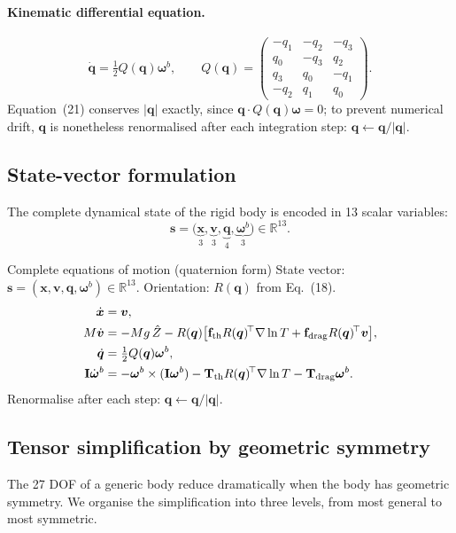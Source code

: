 \documentclass[11pt]{article}
\newcommand{\vect}[1]{\bm{#1}}
\newcommand{\T}{^{\!\top}}
\begin{document}
\paragraph{Kinematic differential equation.}
\begin{equation}
  \dot{\vect q}=\tfrac12 Q(\vect q)\vect\omega^b,\qquad
  Q(\vect q)=\begin{pmatrix}-q_1 & -q_2 & -q_3\\ q_0 & -q_3 & q_2\\ q_3 & q_0 & -q_1\\ -q_2 & q_1 & q_0\end{pmatrix}.
\end{equation}
Equation~(21) conserves $|\vect q|$ exactly, since $\vect q\cdot Q(\vect q)\vect\omega=0$; to prevent numerical drift, $\vect q$ is nonetheless renormalised after each integration step: $\vect q\leftarrow\vect q/|\vect q|$.

\subsection{State-vector formulation}
The complete dynamical state of the rigid body is encoded in 13 scalar variables:
\begin{equation}
  \vect s = \big(\underbrace{\vect x}_{3},\underbrace{\vect v}_{3},\underbrace{\vect q}_{4},\underbrace{\vect\omega^b}_{3}\big)\in\mathbb R^{13}.
\end{equation}
\begin{eqbox}{Complete equations of motion (quaternion form)}
State vector: $\vect s=(\vect x,\vect v,\vect q,\vect\omega^b)\in\mathbb R^{13}$. \quad Orientation: $R(\vect q)$ from Eq.~(18).
\begin{align}
  \dot{\vect x} &= \vect v,\\
  M\dot{\vect v} &= -Mg\,\hat Z - R(\vect q)\big[\mathbf f_{\rm th}R(\vect q)\T\nabla\ln T+\mathbf f_{\rm drag}R(\vect q)\T\vect v\big],\\
  \dot{\vect q} &= \tfrac12 Q(\vect q)\vect\omega^b,\\
  \mathbf I\dot{\vect\omega}^b &= -\vect\omega^b\times(\mathbf I\vect\omega^b)-\mathbf T_{\rm th}R(\vect q)\T\nabla\ln T-\mathbf T_{\rm drag}\vect\omega^b.
\end{align}
Renormalise after each step: $\vect q\leftarrow\vect q/|\vect q|$.
\end{eqbox}

\subsection{Tensor simplification by geometric symmetry}
The 27 DOF of a generic body reduce dramatically when the body has geometric symmetry. We organise the simplification into three levels, from most general to most symmetric.
\end{document}
